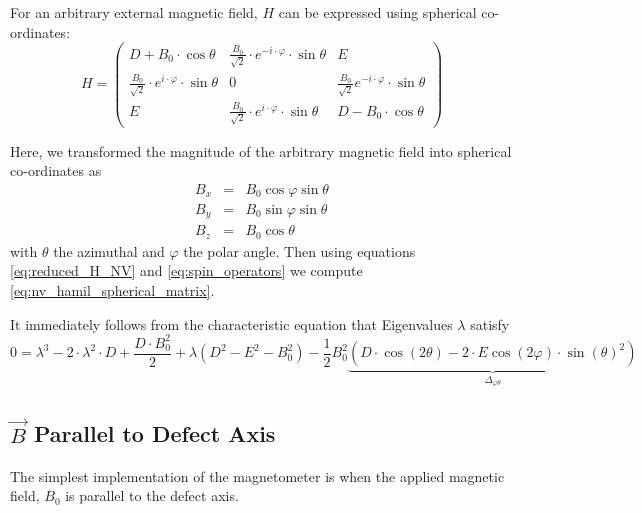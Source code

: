 For an arbitrary external magnetic field, $H$ can be expressed using spherical co-ordinates:
\begin{equation}
	H = \begin{pmatrix}
		D + B_0 \cdot \cos \theta                                       & \frac{B_0}{\sqrt{2}} \cdot e^{-i\cdot \varphi} \cdot \sin\theta & E                                                         \\
		\frac{B_0}{\sqrt{2}} \cdot e^{i \cdot \varphi} \cdot \sin\theta & 0                                                               & \frac{B_0}{\sqrt{2}} e^{-i\cdot \varphi} \cdot \sin\theta \\
		E                                                               & \frac{B_0}{\sqrt{2}} \cdot e^{i \cdot \varphi} \cdot \sin\theta & D - B_0 \cdot \cos \theta
	\end{pmatrix}
	\label{eq:nv_hamil_spherical_matrix}
\end{equation}


Here, we transformed the magnitude of the arbitrary magnetic field into spherical co-ordinates as
\begin{eqnarray}
	B_x  &=& B_0 \cos\varphi \sin\theta \\
	B_y  &=& B_0 \sin\varphi \sin\theta \\
	B_z  &=& B_0 \cos\theta
\end{eqnarray}
with $\theta$ the azimuthal and $\varphi$ the polar angle. Then using equations \ref{eq:reduced_H_NV} and \ref{eq:spin_operators} we compute \ref{eq:nv_hamil_spherical_matrix}.

It immediately follows from the characteristic  equation that Eigenvalues $\lambda$ satisfy
\begin{equation}
	0 = \lambda^3 - 2\cdot \lambda^2 \cdot D + \frac{D \cdot B_0^2}{2} + \lambda(D^2 - E^2 - B_0^2) - \frac{1}{2}B_0^2\underbrace{\left(D \cdot \cos(2\theta) - 2 \cdot E \cos(2\varphi) \cdot \sin(\theta)^2\right)}_{\Delta_{\varphi \theta}}
	\label{eq:nv_spherical_characteristic_equation}
\end{equation}






\subsection{$\vec{B}$ Parallel to Defect Axis}
The simplest implementation of the magnetometer is when the applied magnetic field, $B_0$ is parallel to the defect axis.

